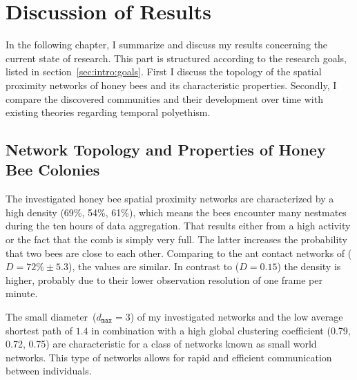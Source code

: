 \section{Discussion of Results}

In the following chapter, I summarize and discuss my results concerning the current state of research.
This part is structured according to the research goals, listed in section~\ref{sec:intro:goals}.
First I discuss the topology of the spatial proximity networks of honey bees and its characteristic properties.
Secondly, I compare the discovered communities and their development over time with existing theories regarding temporal polyethism.

\subsection{Network Topology and Properties of Honey Bee Colonies}
The investigated honey bee spatial proximity networks are characterized by a high density (69\%, 54\%, 61\%), which means the bees encounter many nestmates during the ten hours of data aggregation.
That results either from a high activity or the fact that the comb is simply very full.
The latter increases the probability that two bees are close to each other. 
Comparing to the ant contact networks of \textcite{mersch2013tracking} ($D = 72\%\pm5.3$), the values are similar. In contrast to \textcite{baracchi2014socio} ($D=0.15$) the density is higher, probably due to their lower observation resolution of one frame per minute.


The small diameter~($d_{\texttt{max}}=3$) of my investigated networks and the low average shortest path of $1.4$ in combination with a high global clustering coefficient (0.79, 0.72, 0.75) are characteristic for a class of networks known as small world networks.
This type of networks allows for rapid and efficient communication between individuals.


